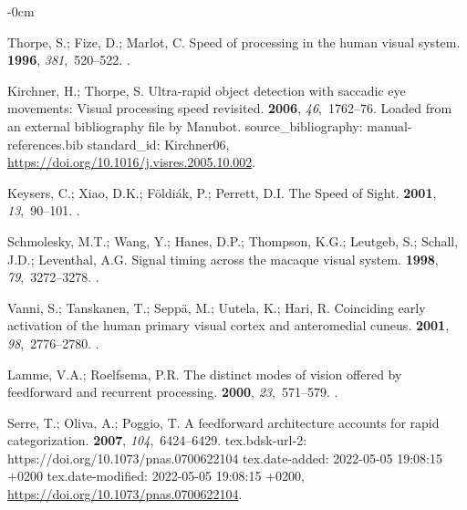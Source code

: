 \documentclass[brainsci, %
               review,submit,pdftex,moreauthors
               ]{Definitions/mdpi}
\begin{document}
\begin{adjustwidth}{-\extralength}{0cm}
\begin{thebibliography}{999}
  Thorpe, S.; Fize, D.; Marlot, C.
  \newblock Speed of processing in the human visual system.
   {\bf 1996}, {\em 381},~520--522.
  .
  
  Kirchner, H.; Thorpe, S.
  \newblock Ultra-rapid object detection with saccadic eye movements: {Visual}
    processing speed revisited.
   {\bf 2006}, {\em 46},~1762--76.
  \newblock Loaded from an external bibliography file by Manubot.
    source\_bibliography: manual-references.bib standard\_id: Kirchner06,
    {\url{https://doi.org/10.1016/j.visres.2005.10.002}}.
  
  Keysers, C.; Xiao, D.K.; Földiák, P.; Perrett, D.I.
  \newblock The {Speed} of {Sight}.
   {\bf 2001}, {\em
    13},~90--101.
  .
  
  Schmolesky, M.T.; Wang, Y.; Hanes, D.P.; Thompson, K.G.; Leutgeb, S.; Schall,
    J.D.; Leventhal, A.G.
  \newblock Signal timing across the macaque visual system.
   {\bf 1998}, {\em 79},~3272--3278.
  .
  
  Vanni, S.; Tanskanen, T.; Seppä, M.; Uutela, K.; Hari, R.
  \newblock Coinciding early activation of the human primary visual cortex and
    anteromedial cuneus.
   {\bf 2001}, {\em 98},~2776--2780.
  .
  
  Lamme, V.A.; Roelfsema, P.R.
  \newblock The distinct modes of vision offered by feedforward and recurrent
    processing.
   {\bf 2000}, {\em 23},~571--579.
  .
  
  Serre, T.; Oliva, A.; Poggio, T.
  \newblock A feedforward architecture accounts for rapid categorization.
   {\bf 2007}, {\em 104},~6424--6429.
  \newblock tex.bdsk-url-2: https://doi.org/10.1073/pnas.0700622104
    tex.date-added: 2022-05-05 19:08:15 +0200 tex.date-modified: 2022-05-05
    19:08:15 +0200, {\url{https://doi.org/10.1073/pnas.0700622104}}.
  

\end{thebibliography}
\end{adjustwidth}
\end{document}
